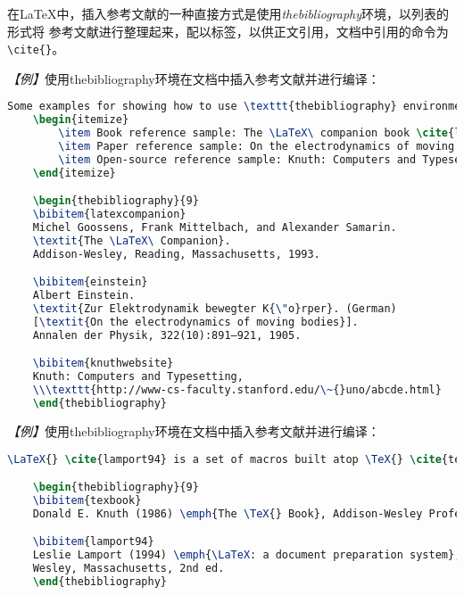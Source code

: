 在LaTeX中，插入参考文献的一种直接方式是使用\emph{thebibliography}环境，以列表的形式将
参考文献进行整理起来，配以标签，以供正文引用，文档中引用的命令为\texttt{\textbackslash{}cite\{\}}。

\emph{【例】}使用thebibliography环境在文档中插入参考文献并进行编译：
\begin{lstlisting}[language=TeX]
    Some examples for showing how to use \texttt{thebibliography} environment:
    \begin{itemize}
        \item Book reference sample: The \LaTeX\ companion book \cite{latexcompanion}.
        \item Paper reference sample: On the electrodynamics of moving bodies \cite{einstein}.
        \item Open-source reference sample: Knuth: Computers and Typesetting \cite{knuthwebsite}.
    \end{itemize}

    \begin{thebibliography}{9}
    \bibitem{latexcompanion} 
    Michel Goossens, Frank Mittelbach, and Alexander Samarin. 
    \textit{The \LaTeX\ Companion}. 
    Addison-Wesley, Reading, Massachusetts, 1993.

    \bibitem{einstein} 
    Albert Einstein. 
    \textit{Zur Elektrodynamik bewegter K{\"o}rper}. (German) 
    [\textit{On the electrodynamics of moving bodies}]. 
    Annalen der Physik, 322(10):891–921, 1905.

    \bibitem{knuthwebsite} 
    Knuth: Computers and Typesetting,
    \\\texttt{http://www-cs-faculty.stanford.edu/\~{}uno/abcde.html}
    \end{thebibliography}
\end{lstlisting}

\emph{【例】}使用thebibliography环境在文档中插入参考文献并进行编译：
\begin{lstlisting}[language=TeX]
    \LaTeX{} \cite{lamport94} is a set of macros built atop \TeX{} \cite{texbook}.

    \begin{thebibliography}{9}
    \bibitem{texbook}
    Donald E. Knuth (1986) \emph{The \TeX{} Book}, Addison-Wesley Professional.

    \bibitem{lamport94}
    Leslie Lamport (1994) \emph{\LaTeX: a document preparation system}, Addison
    Wesley, Massachusetts, 2nd ed.
    \end{thebibliography}
\end{lstlisting}

